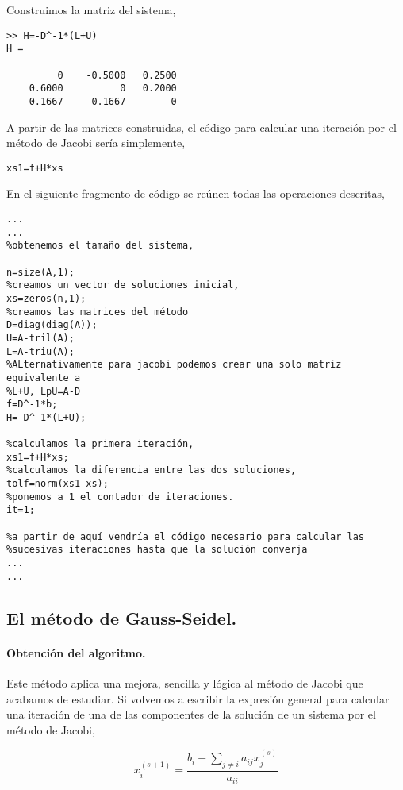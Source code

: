 Construimos la matriz del sistema,

\begin{verbatim}
>> H=-D^-1*(L+U)
H =

         0    -0.5000   0.2500
    0.6000          0   0.2000
   -0.1667     0.1667        0
\end{verbatim}


A partir de las matrices construidas, el código para calcular una iteración por el método de Jacobi sería simplemente,

\begin{verbatim}
xs1=f+H*xs
\end{verbatim}


En el siguiente fragmento de código se reúnen todas las operaciones descritas,

\begin{verbatim}
...
...
%obtenemos el tamaño del sistema,

n=size(A,1);
%creamos un vector de soluciones inicial,
xs=zeros(n,1);
%creamos las matrices del método
D=diag(diag(A));
U=A-tril(A);
L=A-triu(A);
%ALternativamente para jacobi podemos crear una solo matriz equivalente a
%L+U, LpU=A-D
f=D^-1*b;
H=-D^-1*(L+U);

%calculamos la primera iteración,
xs1=f+H*xs;
%calculamos la diferencia entre las dos soluciones,
tolf=norm(xs1-xs);
%ponemos a 1 el contador de iteraciones.
it=1;

%a partir de aquí vendría el código necesario para calcular las
%sucesivas iteraciones hasta que la solución converja
...
...
\end{verbatim}

\subsection{El método de Gauss-Seidel.} 
\paragraph{Obtención del algoritmo.} Este método aplica una mejora, sencilla y lógica al método de Jacobi que acabamos de estudiar. Si volvemos a escribir la expresión general para calcular una iteración de una de las componentes de la solución de un sistema por el método de Jacobi,

\begin{equation*}
x_i^{(s+1)}=\frac{b_i-\sum_{j\neq i}a_{ij}x_j^{(s)}}{a_{ii}}
\end{equation*}

